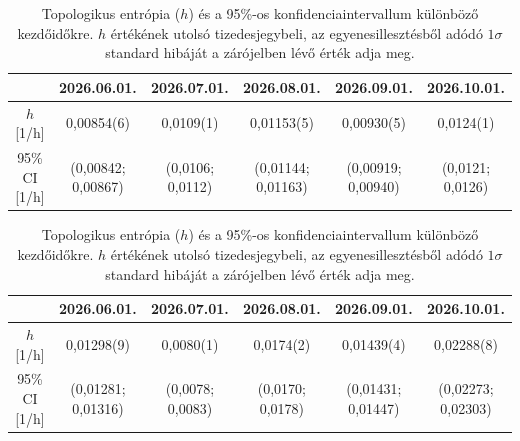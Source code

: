 \documentclass[12pt,a4paper]{article}
\begin{document}
\begin{table}[H]
    \centering
    \footnotesize
    \begin{subtable}{\textwidth}
        \centering
        \begin{tabular}{|c|c|c|c|c|c|}\hline
            & \textbf{2026.06.01.} & \textbf{2026.07.01.} & \textbf{2026.08.01.} & \textbf{2026.09.01.} & \textbf{2026.10.01.} \\\hline
            $h$ [1/h] & 0,00854(6) & 0,0109(1) & 0,01153(5) & 0,00930(5) & 0,0124(1) \\\hline
            95\% CI [1/h] & (0,00842; 0,00867) & (0,0106; 0,0112) & (0,01144; 0,01163) & (0,00919; 0,00940) & (0,0121; 0,0126) \\\hline
        \end{tabular}
        \caption{AIFS}
    \end{subtable}

    \vspace{0.6cm}

    \begin{subtable}{\textwidth}
        \centering
        \begin{tabular}{|c|c|c|c|c|c|}\hline
            & \textbf{2026.06.01.} & \textbf{2026.07.01.} & \textbf{2026.08.01.} & \textbf{2026.09.01.} & \textbf{2026.10.01.} \\\hline
            $h$ [1/h] & 0,01298(9) & 0,0080(1) & 0,0174(2) & 0,01439(4) & 0,02288(8) \\\hline
            95\% CI [1/h] & (0,01281; 0,01316) & (0,0078; 0,0083) & (0,0170; 0,0178) & (0,01431; 0,01447) & (0,02273; 0,02303) \\\hline
        \end{tabular}
        \caption{IFS}
    \end{subtable}
    \caption{Topologikus entrópia ($h$) és a 95\%-os konfidenciaintervallum különböző kezdőidőkre. $h$ értékének utolsó tizedesjegybeli, az egyenesillesztésből adódó $1 \sigma$ standard hibáját a zárójelben lévő érték adja meg.}
    \label{tab:trade500_top}
\end{table}
\end{document}
